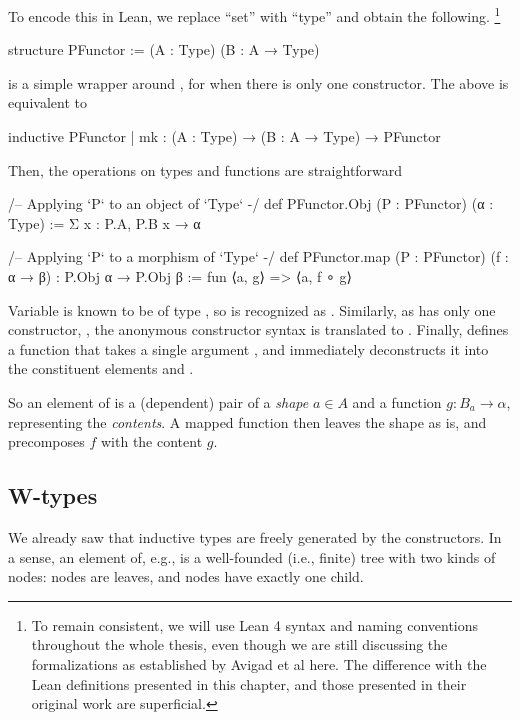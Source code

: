 To encode this in Lean, we replace ``set'' with ``type'' and obtain the following.
\footnote{To remain consistent, we will use Lean 4 syntax and naming conventions throughout the whole thesis, even though we are still discussing the formalizations as established by Avigad et al here. The difference with the Lean definitions presented in this chapter, and those presented in their original work are superficial.}
\begin{leancode}
    structure PFunctor := (A : Type) (B : A → Type)
\end{leancode}

\begin{remark}
     is a simple wrapper around \inductive, for when there is only one constructor.
    The above is equivalent to
    \begin{leancode}
        inductive PFunctor 
        | mk : (A : Type) → (B : A → Type) → PFunctor
    \end{leancode}
\end{remark}

Then, the operations on types and functions are straightforward
\begin{leancode}
    /-- Applying `P` to an object of `Type` -/
    def PFunctor.Obj (P : PFunctor) (α : Type)
        := Σ x : P.A, P.B x → α

    /-- Applying `P` to a morphism of `Type` -/
    def PFunctor.map (P : PFunctor) (f : α → β) : P.Obj α → P.Obj β 
        := fun ⟨a, g⟩ => ⟨a, f ∘ g⟩
\end{leancode}

\begin{remark}
    Variable  is known to be of type , so  is recognized as . Similarly, as  has only one constructor, , the anonymous constructor syntax  is translated to .
    Finally,  defines a function that takes a single argument , and immediately deconstructs it into the constituent elements  and .
\end{remark}

So an element of  is a (dependent) pair of a \emph{shape} $a ∈ A$ and a function $g : B_a \rightarrow \alpha$, representing the \emph{contents}. A mapped function  then leaves the shape as is, and precomposes $f$ with the content $g$.

\subsection*{W-types}
We already saw that inductive types are freely generated by the constructors. In a sense, an element of, e.g.,  is a well-founded (i.e., finite) tree with two kinds of nodes:  nodes are leaves, and  nodes have exactly one child.

